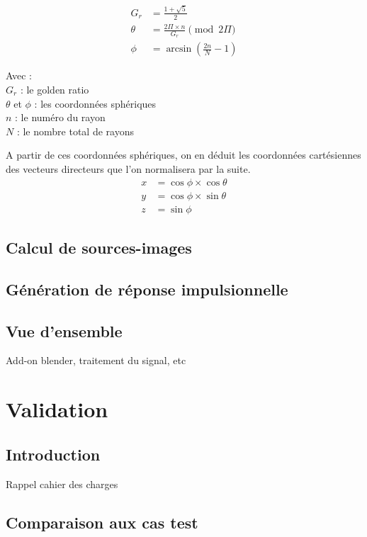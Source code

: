 \begin{align}
G_r &= \frac{1 + \sqrt{5}}{2} \\
\theta &= \frac{2 \Pi \times n}{G_r}  \pmod{2\Pi} \\
\phi &= \arcsin{(\frac{2n}{N}-1)} 
\end{align}

Avec : \\
$G_r$ : le golden ratio \\
$\theta$ et $\phi$ : les coordonnées sphériques \\
$n$ : le numéro du rayon \\
$N$ : le nombre total de rayons

A partir de ces coordonnées sphériques, on en déduit les coordonnées cartésiennes des vecteurs directeurs que l'on normalisera par la suite.
\begin{align}
x &= \cos{\phi} \times \cos{\theta} \\
y &= \cos{\phi} \times \sin{\theta} \\
z &= \sin{\phi}
\end{align}

\section{Calcul de sources-images}
\label{sect_si}
\section{Génération de réponse impulsionnelle}
\section{Vue d'ensemble}
Add-on blender, traitement du signal, etc

\chapter{Validation}
	\minitoc
	\newpage
	\section{Introduction}
	Rappel cahier des charges
	\section{Comparaison aux cas test}
